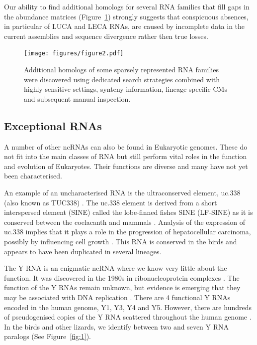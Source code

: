 \documentclass[10pt]{bmc_article}
\newenvironment{bmcformat}{\begin{raggedright}\baselineskip20pt\sloppy\setboolean{publ}{false}}{\end{raggedright}\baselineskip20pt\sloppy}
\begin{document}
\begin{bmcformat}
Our ability to find additional homologs for several RNA families that fill
gaps in the abundance matrices (Figure~\ref{fig:2})
strongly suggests that conspicuous absences, in particular of LUCA and
LECA RNAs, are caused by incomplete data in the current assemblies and
sequence divergence rather then true losses.



 \begin{figure}[ht]
   \texttt{[image: figures/figure2.pdf]}
\caption{Additional homologs of some sparsely represented RNA families were
discovered using dedicated search strategies combined with highly
sensitive settings, synteny information, lineage-specific CMs and
subsequent manual inspection.}\label{fig:2}
 \end{figure}


\subsection*{Exceptional RNAs}


A number of other ncRNAs can also be found in Eukaryotic
genomes. These do not fit into the main classes of RNA but still
perform vital roles in the function and evolution of Eukaryotes.
Their functions are diverse and many have not yet been characterised.

An example of an uncharacterised RNA is the ultraconserved element,
uc.338 (also known as TUC338)
\cite{Bejerano:2004,Bejerano:2006,Braconi:2011}. The uc.338 element
is derived from a short interspersed element (SINE) called the
lobe-finned fishes SINE (LF-SINE) as it is conserved between the
coelacanth and mammals \cite{Bejerano:2006}. Analysis of the
expression of uc.338 implies that it plays a role in the progression
of hepatocellular carcinoma, possibly by influencing cell growth
\cite{Braconi:2011}. This RNA is conserved in the birds and appears to
have been duplicated in several lineages.

The Y RNA is an enigmatic ncRNA where we know very little about the
function. It was discovered in the 1980s in ribonucleoprotein
complexes \cite{Lerner:1981}. The function of the Y RNAs remain
unknown, but evidence is emerging that they may be associated with DNA
replication \cite{Christov:2006}. There are 4 functional Y RNAs
encoded in the human genome, Y1, Y3, Y4 and Y5. However, there are
hundreds of pseudogenised copies of the Y RNA scattered throughout the
human genome \cite{Mosig:2007}. In the birds and other lizards, we
identify between two and seven Y RNA paralogs (See
Figure~\ref{fig:1}).


\end{bmcformat}
\end{document}
